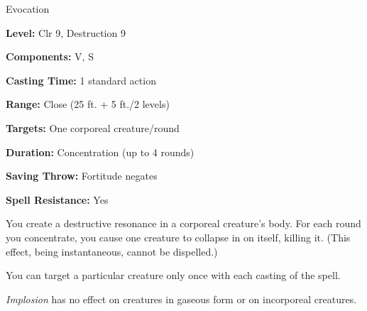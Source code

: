 
Evocation

\textbf{Level:} Clr 9, Destruction 9

\textbf{Components:} V, S

\textbf{Casting Time:} 1 standard action

\textbf{Range:} Close (25 ft. + 5 ft./2 levels)

\textbf{Targets:} One corporeal creature/round

\textbf{Duration:} Concentration (up to 4 rounds)

\textbf{Saving Throw:} Fortitude negates

\textbf{Spell Resistance:} Yes

You create a destructive resonance in a corporeal creature's body. For each round 
you concentrate, you cause one creature to collapse in on itself, killing it. (This 
effect, being instantaneous, cannot be dispelled.)

You can target a particular creature only once with each casting of the spell.

\textit{Implosion} has no effect on creatures in gaseous form or on incorporeal 
creatures.

